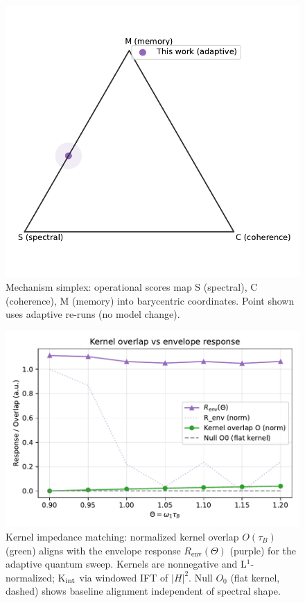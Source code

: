 \documentclass[11pt,letterpaper]{article}
\begin{document}
\begin{figure}[t]
\centering
\includegraphics[width=0.56\linewidth]{figG_mechanism_simplex.pdf}
\caption{Mechanism simplex: operational scores map S (spectral), C (coherence), M (memory) into barycentric coordinates. Point shown uses adaptive re-runs (no model change).}
\end{figure}

\begin{figure}[t]
\centering
\includegraphics[width=0.8\linewidth]{figH_kernel_overlap.pdf}
\caption{Kernel impedance matching: normalized kernel overlap $O(\tau_B)$ (green) aligns with the envelope response $R_{\mathrm{env}}(\Theta)$ (purple) for the adaptive quantum sweep. Kernels are nonnegative and L$^1$-normalized; K$_{\rm int}$ via windowed IFT of $|H|^2$. Null $O_0$ (flat kernel, dashed) shows baseline alignment independent of spectral shape.}
\end{figure}
\end{document}
